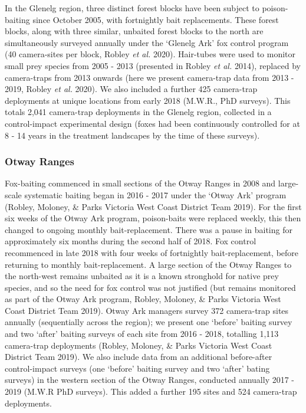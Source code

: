 \documentclass[11pt,a4paper,titlepage,twoside,openright]{style/unimelbthesis}
\begin{document}
\begin{mainmatter}
In the Glenelg region, three distinct forest blocks have been subject to poison-baiting since October 2005, with fortnightly bait replacements. These forest blocks, along with three similar, unbaited forest blocks to the north are simultaneously surveyed annually under the `Glenelg Ark' fox control program (40 camera-sites per block, Robley \emph{et al.} 2020). Hair-tubes were used to monitor small prey species from 2005 - 2013 (presented in Robley \emph{et al.} 2014), replaced by camera-traps from 2013 onwards (here we present camera-trap data from 2013 - 2019, Robley \emph{et al.} 2020). We also included a further 425 camera-trap deployments at unique locations from early 2018 (M.W.R., PhD surveys). This totals 2,041 camera-trap deployments in the Glenelg region, collected in a control-impact experimental design (foxes had been continuously controlled for at 8 - 14 years in the treatment landscapes by the time of these surveys).

\hypertarget{otway-ranges-1}{%
\subsubsection{Otway Ranges}\label{otway-ranges-1}}

Fox-baiting commenced in small sections of the Otway Ranges in 2008 and large-scale systematic baiting began in 2016 - 2017 under the `Otway Ark' program (Robley, Moloney, \& Parks Victoria West Coast District Team 2019). For the first six weeks of the Otway Ark program, poison-baits were replaced weekly, this then changed to ongoing monthly bait-replacement. There was a pause in baiting for approximately six months during the second half of 2018. Fox control recommenced in late 2018 with four weeks of fortnightly bait-replacement, before returning to monthly bait-replacement. A large section of the Otway Ranges to the north-west remains unbaited as it is a known stronghold for native prey species, and so the need for fox control was not justified (but remains monitored as part of the Otway Ark program, Robley, Moloney, \& Parks Victoria West Coast District Team 2019). Otway Ark managers survey 372 camera-trap sites annually (sequentially across the region); we present one `before' baiting survey and two `after' baiting surveys of each site from 2016 - 2018, totalling 1,113 camera-trap deployments (Robley, Moloney, \& Parks Victoria West Coast District Team 2019). We also include data from an additional before-after control-impact surveys (one `before' baiting survey and two `after' bating surveys) in the western section of the Otway Ranges, conducted annually 2017 - 2019 (M.W.R PhD surveys). This added a further 195 sites and 524 camera-trap deployments.


\end{mainmatter}
\end{document}
